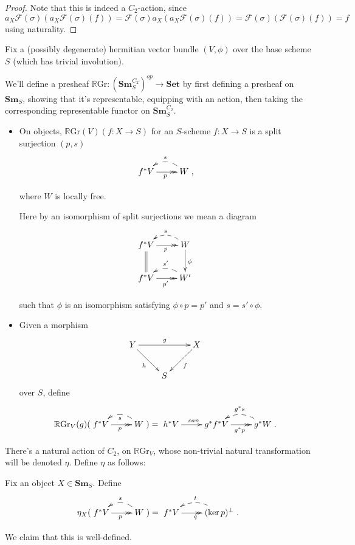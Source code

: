 \documentclass[draftthesis,tocnosub,noragright,centerchapter,10pt]{uiucthesis2009}
\newcommand{\mc}{\mathcal}
\newcommand{\RGr}{\mathbb R\mathrm{Gr}}
\newcommand{\Set}{\mathbf{Set}}
\newcommand{\Sm}[1]{\mathbf{Sm}_{#1}}
\theoremstyle{plain}
\theoremstyle{definition}
\begin{document}
\begin{proof}
Note that this is indeed a $C_2$-action, since $a_X \mc F(\sigma)(
a_X\mc F(\sigma)(f)) = \mc F(\sigma) a_X(a_X \mc F(\sigma)(f)) = \mc
F(\sigma)(\mc F(\sigma)(f)) = f$ using naturality. 
\end{proof}

Fix a (possibly degenerate) hermitian vector bundle $(V,\phi)$ over the base scheme $S$
(which has trivial involution). 

We'll define a presheaf $\RGr : (\Sm{S}^{C_2})^{op} \rightarrow \Set$
by first defining a presheaf on $\Sm{S}$, showing that it's
representable, equipping with an action, then taking the corresponding
representable functor on $\Sm{S}^{C_2}$.

\begin{itemize}
\item On objects, $\RGr(V)(f: X \rightarrow S)$ for an $S$-scheme $f :
  X \rightarrow S$ is a split surjection $(p,s)$
\[
\xymatrix{f^*V \ar@{>>}[r]_p & \ar@/_1.0pc/@{-->}[l]_sW},
\]

where $W$ is locally free. 

Here by an isomorphism of split surjections we mean a diagram
\[
\xymatrix{f^*V \ar@{>>}[r]_p \ar@{=}[d]& \ar@/_1.0pc/@{-->}[l]_sW \ar[d]^\phi\\
f^*V \ar@{>>}[r]_{p'} & \ar@/_1.0pc/@{-->}[l]_{s'}W'}
\]

such that $\phi$ is an isomorphism satisfying $\phi \circ p = p'$ and $s = s'\circ \phi$.

\item Given a morphism 
\[
\xymatrix{Y\ar[dr]_h \ar[rr]^g &&X\ar[dl]^f\\& S&}
\]
over $S$, define
\[
\RGr_V(g)(\xymatrix{f^*V \ar@{>>}[r]_p & \ar@/_1.0pc/@{-->}[l]^sW}) = 
\xymatrix{h^*V \ar[r]^{can} & g^*f^*V \ar@{>>}[r]_{g^*p} &
  \ar@/_1.0pc/@{-->}[l]_{g^*s} g^*W}.
\]
\end{itemize}
There's a natural action of $C_2$, on $\RGr_V$, whose non-trivial
natural transformation will be denoted $\eta$. Define $\eta$ as
follows: 

 Fix an object $X \in \Sm{S}$. Define
\[
\eta_X(\xymatrix{f^*V \ar@{>>}[r]_p & \ar@/_1.0pc/@{-->}[l]_sW}) =
\xymatrix{f^*V \ar@{>>}[r]_q & \ar@/_1.0pc/@{-->}[l]_t(\ker p)^\perp}.
\]

We claim that this is well-defined. %
\end{document}
